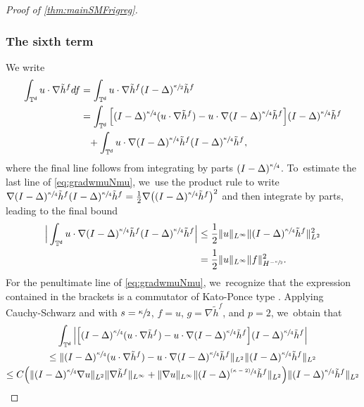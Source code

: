 \documentclass[10pt]{amsart}
\newcommand{\psfrac}[2]{\sfrac{(#1)}{#2}}
\theoremstyle{plain}
\theoremstyle{definition}
\let\div\relax
\DeclareMathOperator{\div}{\mathrm{div}}
\newcommand{\T}{{\mathbb{T}}}
\let\ka\kappa
\let\nab\nabla
\let\tl\tilde
\newcommand{\ph}{\phantom{=}}
\renewcommand{\d}{\mathsf{d}}
\begin{document}
\begin{proof}[Proof of \cref{thm:mainSMFrigreg}]
\subsubsection*{The sixth term} We write
\begin{equation}\label{eq:gradwmuNmu}
\begin{aligned}
\int_{\T^\d}u\cdot \nab \tl{h}^f df &= \int_{\T^\d}u\cdot \nab\tl{h}^{f} (I-\Delta)^{\sfrac{\ka}{2}}\tl{h}^{f}\\
&=\int_{\T^\d}\Big[(I-\Delta)^{\sfrac{\ka}{4}}(u\cdot\nab\tl{h}^{f}) - u\cdot\nab(I-\Delta)^{\sfrac{\ka}{4}}\tl{h}^{f}\Big](I-\Delta)^{\sfrac{\ka}{4}}\tl{h}^{f}\\
&\ph + \int_{\T^\d}u\cdot\nab(I-\Delta)^{\sfrac{\ka}{4}}\tl{h}^{f} (I-\Delta)^{\sfrac{\ka}{4}}\tl{h}^{f},
\end{aligned}
\end{equation}
where the final line follows from integrating by parts $(I-\Delta)^{\sfrac{\ka}{4}}$. To~estimate the last line of \eqref{eq:gradwmuNmu}, we~use the product rule to write $\nab(I-\Delta)^{\sfrac{\ka}{4}}\tl{h}^{f} (I-\Delta)^{\sfrac{\ka}{4}}\tl{h}^{f} = \frac12\nab\big((I-\Delta)^{\sfrac{\ka}{4}}\tl{h}^{f}\big)^2$ and then integrate by parts, leading to the final bound
\begin{equation}
\begin{aligned}\label{eq:gradwmuNmu1}
\Big|\int_{\T^\d}u\cdot\nab(I-\Delta)^{\sfrac{\ka}{4}}\tl{h}^{f} (I-\Delta)^{\sfrac{\ka}{4}}\tl{h}^{f}\Big| &\le \frac12\|\div u\|_{L^\infty} \|(I-\Delta)^{\sfrac{\ka}{4}}\tl{h}^{f}\|_{L^2}^2\\
&= \frac12\|\div u\|_{L^\infty} \|f\|_{H^{-\sfrac\ka2}}^2.
\end{aligned}
\end{equation}
For the penultimate line of \eqref{eq:gradwmuNmu}, we~recognize that the expression contained in the brackets is a commutator of Kato-Ponce type \cite{KP1988}. Applying Cauchy-Schwarz and \cite[Th.\,1.1]{Li2019} with $s=\sfrac{\ka}{2}$, $f= u$, $g=\nab\tl{h}^{f}$, and $p=2$, we~obtain that
\begin{multline}\label{eq:gradwmuNmu2}
\int_{\T^\d}\Big|\Big[(I-\Delta)^{\sfrac{\ka}{4}}(u\cdot\nab\tl{h}^f) - u\cdot\nab(I-\Delta)^{\sfrac{\ka}{4}}\tl{h}^{f}\Big](I-\Delta)^{\sfrac{\ka}{4}}\tl{h}^{f}\Big|\\
\le \|(I-\Delta)^{\sfrac{\ka}{4}}(u\cdot\nab\tl{h}^{f}) - u\cdot\nab(I-\Delta)^{\sfrac{\ka}{4}}\tl{h}^{f}\|_{L^2}\|(I-\Delta)^{\sfrac{\ka}{4}}\tl{h}^{f}\|_{L^2}\\
\le C\Big(\|(I-\Delta)^{\sfrac{\ka}{4}}\nab u\|_{L^2} \|\nab\tl{h}^{f}\|_{L^\infty} + \|\nab u\|_{L^\infty}\|(I-\Delta)^{\psfrac{\ka-2}{4}}\tl{h}^{f}\|_{L^2} \Big)\|(I-\Delta)^{\sfrac{\ka}{4}}\tl{h}^{f}\|_{L^2}\\

\end{multline}
\end{proof}
\end{document}
